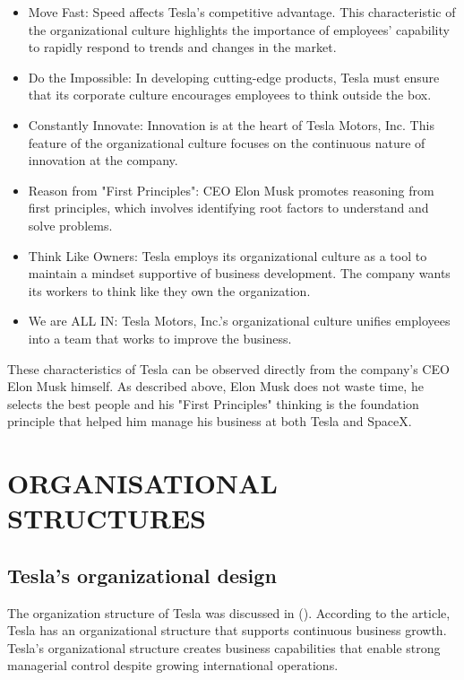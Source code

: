 \documentclass[12pt]{article}
\begin{document}
\begin{itemize}
	\item{Move Fast: Speed affects Tesla's competitive advantage. This characteristic of the organizational culture highlights the importance of employees' capability to rapidly respond to trends and changes in the market.}

	\item{Do the Impossible: In developing cutting-edge products, Tesla must ensure that its corporate culture encourages employees to think outside the box.}

	\item{Constantly Innovate: Innovation is at the heart of Tesla Motors, Inc. This feature of the organizational culture focuses on the continuous nature of innovation at the company.}

	\item{Reason from "First Principles": CEO Elon Musk promotes reasoning from first principles, which involves identifying root factors to understand and solve problems.}

	\item{Think Like Owners: Tesla employs its organizational culture as a tool to maintain a mindset supportive of business development. The company wants its workers to think like they own the organization.}

	\item{We are ALL IN: Tesla Motors, Inc.'s organizational culture unifies employees into a team that works to improve the business.}
\end{itemize}

These characteristics of Tesla can be observed directly from the company's CEO Elon Musk himself. As described above, Elon Musk does not waste time, he selects the best people and his "First Principles" thinking is the foundation principle that helped him manage his business at both Tesla and SpaceX.

\section{ORGANISATIONAL STRUCTURES}

\subsection{Tesla's organizational design}

The organization structure of Tesla was discussed in (\cite{me17b}). According to the article, Tesla has an organizational structure that supports continuous business growth. Tesla's organizational structure creates business capabilities that enable strong managerial control despite growing international operations.
\end{document}
